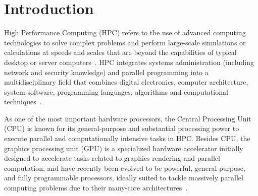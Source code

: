 \section{Introduction}


\par
High Performance Computing (HPC) refers to the use of advanced computing technologies to solve complex problems and perform large-scale simulations or calculations at speeds and scales that are beyond the capabilities of typical desktop or server computers~\cite{hpc}.
HPC integrates systems administration (including network and security knowledge) and parallel programming into a multidisciplinary field that combines digital electronics, computer architecture, system software, programming languages, algorithms and computational techniques~\cite{hpc}.


\par
As one of the most important hardware processors, the Central Processing Unit (CPU) is known for its general-purpose and substantial processing power to execute parallel and computationally intensive tasks in HPC.
Besides CPU, the graphics processing unit (GPU) is a specialized hardware accelerator initially designed to accelerate tasks related to graphics rendering and parallel computation, and have recently been evolved to be powerful, general-purpose, and fully programmable processors, ideally suited to tackle massively parallel computing problems due to their many-core architectures~\cite{gpu_wiki}.


